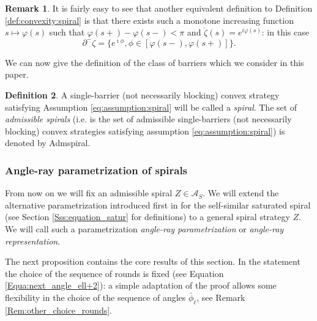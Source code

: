 \documentclass[reqno]{amsart}
\newcounter{assu}
\theoremstyle{definition} \newtheorem{definition}{Definition}[section]
\theoremstyle{definition} \newtheorem{remark}[definition]{Remark}
\theoremstyle{plain} \newtheorem{lemma}[definition]{Lemma}
\theoremstyle{plain} \newtheorem{proposition}[definition]{Proposition}
\theoremstyle{plain} \newtheorem{theorem}[definition]{Theorem}
\theoremstyle{plain} \newtheorem{corollary}[definition]{Corollary}
\theoremstyle{definition} \newtheorem{example}[definition]{Example}
\theoremstyle{plain} \newtheorem{claim}[clai]{Claim}
\theoremstyle{definition} \newtheorem{assumption}[definition]{Assumption}
\theoremstyle{definition} \newtheorem{observation}[definition]{Observation}
\newcommand{\1}{\mathbbm 1}
\renewcommand{\i}{\imath}
\numberwithin{equation}{section} %
\theoremstyle{plain} \newtheorem*{theorem*}{Theorem}
\theoremstyle{plain} \newtheorem{mthm}[maintheorem]{Main Theorem}
\theoremstyle{plain} \newtheorem*{mthm*}{Main Theorem}
\theoremstyle{plain} \newtheorem*{conjecture*}{Conjecture}
\theoremstyle{plain} \newtheorem{conjecture}[definition]{Conjecture}
\theoremstyle{plain} \newtheorem*{problem*}{Problem}
\begin{document}
\begin{remark}
\label{Rem:another_def}
It is fairly easy to see that another equivalent definition to Definition \ref{def:convexity:spiral} is that there exists such a monotone increasing function $s \mapsto \varphi(s)$ such that $\varphi(s+) - \varphi(s-) < \pi$ and $\dot \zeta(s) = e^{i\varphi(s)}$: in this case
\begin{equation*}
\partial^- \zeta = \big\{ e^{\i \phi}, \phi \in [\varphi(s-),\varphi(s+)] \big\}.
\end{equation*}
\end{remark}

We can now give the definition of the class of barriers which we consider in this paper.

\begin{definition}
\label{def:adm:spirals}
A single-barrier (not necessarily blocking) convex strategy satisfying Assumption \eqref{eq:assumption:spiral} will be called a \emph{spiral}. The set of \emph{admissible spirals} (i.e. is the set of admissible single-barriers (not necessarily blocking) convex strategies satisfying assumption \eqref{eq:assumption:spiral}) is denoted by \gls{Admspiral}.
\end{definition}


\subsubsection{Angle-ray parametrization of spirals}
\label{Sss:alternative_angles}


From now on we will fix an admissible spiral $Z \in \mathcal{A}_S$. We will extend the alternative parametrization introduced first in \cite{firefighter} for the self-similar saturated spiral (see Section \ref{Sss:equation_satur} for definitions) to a general spiral strategy $Z$. We will call such a parametrization \emph{angle-ray parametrization} or \emph{angle-ray representation}.

The next proposition contains the core results of this section. In the statement the choice of the sequence of rounds is fixed (see Equation \ref{Equa:next_angle_ell+2}): a simple adaptation of the proof allows some flexibility in the choice of the sequence of angles $\bar \phi_\ell$, see Remark \ref{Rem:other_choice_rounds}.
\end{document}
